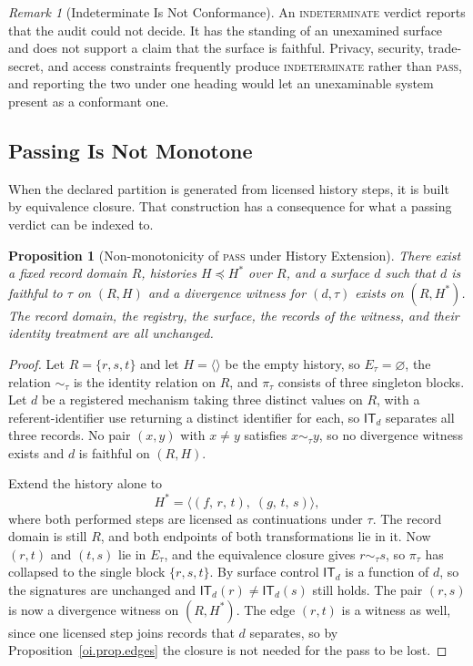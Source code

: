 \documentclass[11pt]{article}
\theoremstyle{plain}
\newtheorem{proposition}[theorem]{Proposition}
\theoremstyle{definition}
\theoremstyle{remark}
\newtheorem{remark}[theorem]{Remark}
\newcommand{\IT}{\ensuremath{\mathsf{IT}}}
\newcommand{\PASS}{\textnormal{\textsc{pass}}}
\newcommand{\INDET}{\textnormal{\textsc{indeterminate}}}
\begin{document}
\begin{remark}[Indeterminate Is Not Conformance]
  \label{oi.rem.indet}
  An \INDET{} verdict reports that the audit could not decide.
  It has the standing of an unexamined surface
  and does not support a claim that the surface is faithful.
  Privacy, security, trade-secret, and access constraints
  frequently produce \INDET{} rather than \PASS{},
  and reporting the two under one heading
  would let an unexaminable system present as a conformant one.
\end{remark}

\subsection{Passing Is Not Monotone}

When the declared partition is generated from licensed
history steps, it is built by equivalence closure.
That construction has a consequence for what a passing
verdict can be indexed to.

\begin{proposition}[Non-monotonicity of \PASS{} under History Extension]
  \label{oi.prop.nonmonotone}
  There exist a fixed record domain \(R\),
  histories \(H\preceq H^{\ast}\) over \(R\),
  and a surface \(d\)
  such that \(d\) is faithful to \(\tau\) on \((R,H)\)
  and a divergence witness for \((d,\tau)\) exists on \((R,H^{\ast})\).
  The record domain, the registry, the surface,
  the records of the witness,
  and their identity treatment are all unchanged.
\end{proposition}

\begin{proof}
  Let \(R=\{r,s,t\}\) and let \(H=\langle\rangle\) be the empty history,
  so \(E_{\tau}=\varnothing\),
  the relation \(\sim_{\tau}\) is the identity relation on \(R\),
  and \(\pi_{\tau}\) consists of three singleton blocks.
  Let \(d\) be a registered mechanism taking three distinct values on \(R\),
  with a referent-identifier use returning a distinct identifier for each,
  so \(\IT_d\) separates all three records.
  No pair \((x,y)\) with \(x\neq y\) satisfies \(x\sim_{\tau}y\),
  so no divergence witness exists
  and \(d\) is faithful on \((R,H)\).

  Extend the history alone to
  \[
    H^{\ast}
    =
    \bigl\langle
    (f,\,r,\,t),\;
    (g,\,t,\,s)
    \bigr\rangle,
  \]
  where both performed steps are licensed as continuations
  under \(\tau\).
  The record domain is still \(R\),
  and both endpoints of both transformations lie in it.
  Now \((r,t)\) and \((t,s)\) lie in \(E_{\tau}\),
  and the equivalence closure gives \(r\sim_{\tau}s\),
  so \(\pi_{\tau}\) has collapsed to the single block \(\{r,s,t\}\).
  By surface control \(\IT_d\) is a function of \(d\),
  so the signatures are unchanged
  and \(\IT_d(r)\neq\IT_d(s)\) still holds.
  The pair \((r,s)\) is now a divergence witness on \((R,H^{\ast})\).
  The edge \((r,t)\) is a witness as well,
  since one licensed step joins records that \(d\) separates,
  so by Proposition~\ref{oi.prop.edges}
  the closure is not needed for the pass to be lost.
\end{proof}
\end{document}
